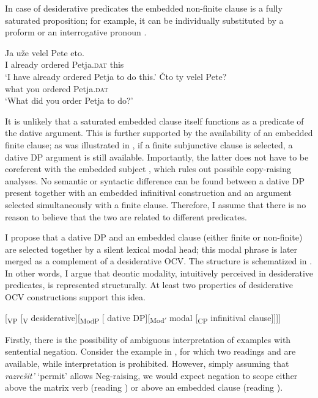 \documentclass[output=paper,
colorlinks,
citecolor=brown,
newtxmath
]{langscibook}
\begin{document}
In case of desiderative predicates the embedded non-finite clause is a fully saturated proposition; for example, it can be individually substituted by a proform  or an interrogative pronoun .

\ea\label{ex13}
\ea\label{ex13a} 
\gll Ja uže velel Pete eto.\\ 
    I already ordered Petja.\textsc{dat} this\\
\glt `I have already ordered Petja to do this.'
\ex\label{ex13b}
\gll Čto ty velel Pete?\\ 
    what you ordered Petja.\textsc{dat}\\
\glt `What did you order Petja to do?'
\z
\z

\noindent It is unlikely that a saturated embedded clause itself functions as a predicate of the dative argument. This is further supported by the availability of an embedded finite clause; as was illustrated in , if a finite subjunctive clause is selected, a dative DP argument is still available. Importantly, the latter does not have to be coreferent with the embedded subject , which rules out possible copy-raising analyses. No semantic or syntactic difference can be found between a dative DP present together with an embedded infinitival construction and an argument selected simultaneously with a finite clause. Therefore, I assume that there is no reason to believe that the two are related to different predicates. \par

I propose that a dative DP and an embedded clause (either finite or non-finite) are selected together by a silent lexical modal head; this modal phrase is later merged as a complement of a desiderative OCV. The structure is schematized in . In other words, I argue that deontic modality, intuitively perceived in desiderative predicates, is represented structurally. At least two properties of desiderative OCV constructions support this idea. 

\ea
\label{ex14} 
{[\textsubscript{VP} [\textsubscript{V} desiderative][\textsubscript{ModP} [\hspace{-2pt} dative DP][\textsubscript{Mod$'$} modal [\textsubscript{CP} infinitival clause]]]]}
\z

\noindent Firstly, there is the possibility of ambiguous interpretation of examples with sentential negation. Consider the example in , for which two readings  and  are available, while interpretation  is prohibited. However, simply assuming that \textit{razrešit’} `permit’ allows Neg-raising, we would expect negation to scope either above the matrix verb (reading ) or above an embedded clause (reading ). 
\end{document}
